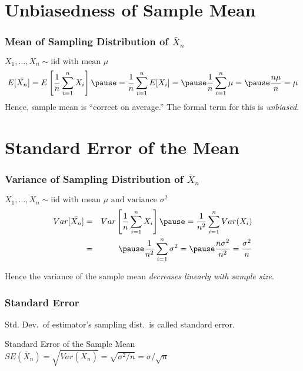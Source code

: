 \section{Unbiasedness of Sample Mean}
%
\begin{frame}
\frametitle{Mean of Sampling Distribution of $\bar{X}_n$}
\alert{$X_1, \hdots, X_n \sim \mbox{iid with mean }\mu$}
\begin{eqnarray*}
E[\bar{X_n}] = E\left[ \frac{1}{n}\sum_{i=1}^n X_i \right]\pause = \frac{1}{n} \sum_{i=1}^n E[X_i] = \pause\frac{1}{n} \sum_{i=1}^n \mu = \pause \frac{n\mu}{n} = \mu
\end{eqnarray*}
\alert{Hence, sample mean is ``correct on average.'' The formal term for this is \emph{unbiased}.}
\end{frame}

\section{Standard Error of the Mean}
%

\begin{frame}
\frametitle{Variance of Sampling Distribution of $\bar{X}_n$}
\alert{$X_1, \hdots, X_n \sim \mbox{iid with mean }\mu \mbox{ and variance } \sigma^2$}
\begin{eqnarray*}
Var[\bar{X_n}] &=& Var\left[ \frac{1}{n}\sum_{i=1}^n X_i \right] \pause= \frac{1}{n^2} \sum_{i=1}^n Var(X_i) \\
&=& \pause \frac{1}{n^2} \sum_{i=1}^n \sigma^2 = \pause \frac{n\sigma^2}{n^2} =  \frac{\sigma^2}{n}
\end{eqnarray*}

\alert{Hence the variance of the sample mean \emph{decreases linearly with sample size}.}
\end{frame}
\begin{frame}
\frametitle{Standard Error}
Std. Dev.\ of estimator's sampling dist.\ is called \alert{standard error}.
\begin{block}{Standard Error of the Sample Mean}
$SE(\bar{X}_n)= \sqrt{Var\left(\bar{X}_n\right)}= \sqrt{\sigma^2/n}=\sigma/\sqrt{n}$
\end{block}
\end{frame}

